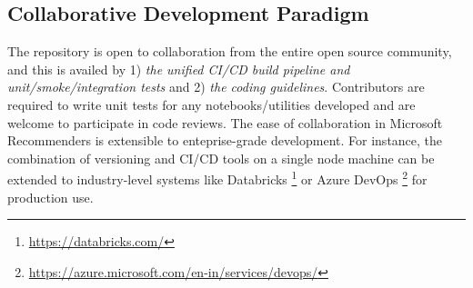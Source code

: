 \subsection{Collaborative Development Paradigm} %

The repository is open to collaboration from the entire open source community, and this is availed by 
1) \textit{the unified CI/CD build pipeline and unit/smoke/integration tests} and  
2) \textit{the coding guidelines}. Contributors are required to write unit tests for any notebooks/utilities developed and 
are welcome to participate in code reviews.
The ease of collaboration in Microsoft Recommenders is extensible to enteprise-grade development. 
For instance, the combination of versioning and CI/CD tools on a single node machine can be extended to industry-level systems like Databricks \footnote{\url{https://databricks.com/}} or Azure DevOps \footnote{\url{https://azure.microsoft.com/en-in/services/devops/}} for production use.